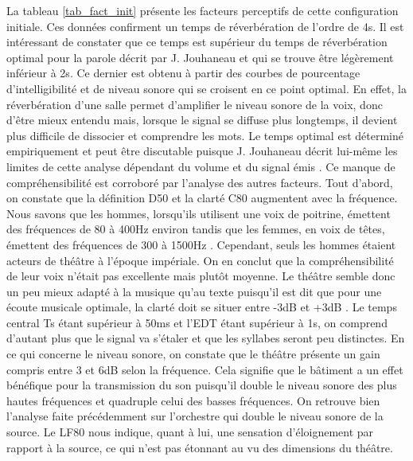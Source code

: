 La tableau \ref{tab_fact_init} présente les facteurs perceptifs de cette configuration initiale. Ces données confirment un temps de réverbération de l'ordre de 4s. Il est intéressant de constater que ce temps est supérieur du temps de réverbération optimal pour la parole décrit par J. Jouhaneau \cite[p.209]{jouhaneau} et qui se trouve être légèrement inférieur à 2s. Ce dernier est obtenu à partir des courbes de pourcentage d'intelligibilité et de niveau sonore qui se croisent en ce point optimal. En effet, la réverbération d'une salle permet d'amplifier le niveau sonore de la voix, donc d'être mieux entendu mais, lorsque le signal se diffuse plus longtemps, il devient plus difficile de dissocier et comprendre les mots. Le temps optimal est déterminé empiriquement et peut être discutable puisque J. Jouhaneau décrit lui-même les limites de cette analyse dépendant du volume et du signal émis \cite[p.218]{jouhaneau}. Ce manque de compréhensibilité est corroboré par l'analyse des autres facteurs. Tout d'abord, on constate que la définition \gls{D50} et la clarté \gls{C80} augmentent avec la fréquence. Nous savons que les hommes, lorsqu'ils utilisent une voix de poitrine, émettent des fréquences de 80 à 400Hz environ tandis que les femmes, en voix de têtes, émettent des fréquences de 300 à 1500Hz \cite[Mécanismes vocaux]{voix}. Cependant, seuls les hommes étaient acteurs de théâtre à l'époque impériale. On en conclut que la compréhensibilité de leur voix n'était pas excellente mais plutôt moyenne. Le théâtre semble donc un peu mieux adapté à la musique qu'au texte puisqu'il est dit que pour une écoute musicale optimale, la clarté doit se situer entre -3dB et +3dB \cite[p.59]{acoustique}. Le temps central \gls{Ts} étant supérieur à 50ms et l'\gls{EDT} étant supérieur à 1s, on comprend d'autant plus que le signal va s'étaler et que les syllabes seront peu distinctes. En ce qui concerne le niveau sonore, on constate que le théâtre présente un gain compris entre 3 et 6dB selon la fréquence. Cela signifie que le bâtiment a un effet bénéfique pour la transmission du son puisqu'il double le niveau sonore des plus hautes fréquences et quadruple celui des basses fréquences. On retrouve bien l'analyse faite précédemment sur l'orchestre qui double le niveau sonore de la source. Le \gls{LF80} nous indique, quant à lui, une sensation d'éloignement par rapport à la source, ce qui n'est pas étonnant au vu des dimensions du théâtre.
%
